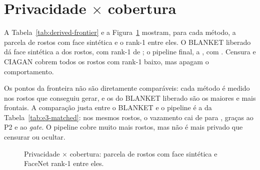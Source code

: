 \section{Privacidade \texorpdfstring{$\times$}{x} cobertura}
\label{sec:r-fronteira}

A Tabela~\ref{tab:derived-frontier} e a Figura~\ref{fig:derived-frontier} mostram, para cada método, a parcela de rostos com face sintética e o rank-1 entre eles. O BLANKET liberado dá face sintética a  dos rostos, com rank-1 de ; o pipeline final, a , com . Censura e CIAGAN cobrem todos os rostos com rank-1 baixo, mas apagam o comportamento.

Os pontos da fronteira não são diretamente comparáveis: cada método é medido nos rostos que conseguiu gerar, e os do BLANKET liberado são os maiores e mais frontais. A comparação justa entre o BLANKET e o pipeline é a da Tabela~\ref{tab:e3-matched}: nos mesmos rostos, o vazamento cai de  para , graças ao P2 e ao \emph{gate}. O pipeline cobre muito mais rostos, mas não é mais privado que censurar ou ocultar.

\begin{table}[ht]\centering
\caption{Parcela de rostos com face sintética e FaceNet rank-1 entre eles, por método.}
\label{tab:derived-frontier}
\small

\end{table}

\begin{figure}[ht]\centering
\caption{Privacidade $\times$ cobertura: parcela de rostos com face sintética e FaceNet rank-1 entre eles.}
\label{fig:derived-frontier}

\fonteautor
\end{figure}

\begin{table}[ht]\centering
\caption{Geometria do P2: cosseno do alvo da troca com a identidade sintética e com a real, e rank-1 medido nos rostos trocados.}
\label{tab:derived-p2geom}

\end{table}
